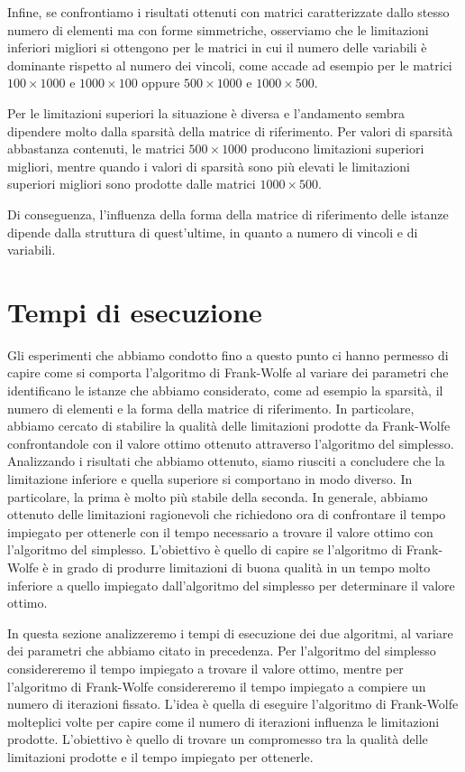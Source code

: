 Infine, se confrontiamo i risultati ottenuti con matrici caratterizzate dallo stesso numero di elementi ma con forme
simmetriche, osserviamo che le limitazioni inferiori migliori si ottengono per le matrici in cui il numero delle
variabili è dominante rispetto al numero dei vincoli, come accade ad esempio per le matrici \( 100\times 1000 \) e  \(
1000\times 100 \) oppure \( 500\times 1000 \) e  \( 1000\times 500 \).

Per le limitazioni superiori la situazione è diversa e l'andamento sembra dipendere molto dalla sparsità della
matrice di riferimento. Per valori di sparsità abbastanza contenuti, le matrici \( 500\times 1000 \) producono
limitazioni superiori migliori, mentre quando i valori di sparsità sono più elevati le limitazioni superiori migliori
sono prodotte dalle matrici  \( 1000\times 500 \).

Di conseguenza, l'influenza della forma della matrice di riferimento delle istanze dipende dalla struttura di
quest'ultime, in quanto a numero di vincoli e di variabili.

\section{Tempi di esecuzione}
Gli esperimenti che abbiamo condotto fino a questo punto ci hanno permesso di capire come si comporta l'algoritmo di
Frank-Wolfe al variare dei parametri che identificano le istanze che abbiamo considerato, come ad esempio la sparsità,
il numero di elementi e la forma della matrice di riferimento. In particolare, abbiamo cercato di stabilire la qualità
delle limitazioni prodotte da Frank-Wolfe confrontandole con il valore ottimo ottenuto attraverso l'algoritmo del
simplesso. Analizzando i risultati che abbiamo ottenuto, siamo riusciti a concludere che la limitazione inferiore e
quella superiore si comportano in modo diverso. In particolare, la prima è molto più stabile della seconda. In generale,
abbiamo ottenuto delle limitazioni ragionevoli che richiedono ora di confrontare il tempo impiegato per ottenerle con il
tempo necessario a trovare il valore ottimo con l'algoritmo del simplesso. L'obiettivo è quello di capire se
l'algoritmo di Frank-Wolfe è in grado di produrre limitazioni di buona qualità in un tempo molto inferiore a quello
impiegato dall'algoritmo del simplesso per determinare il valore ottimo.

In questa sezione analizzeremo i tempi di esecuzione dei due algoritmi, al variare dei parametri che abbiamo
citato in precedenza. Per l'algoritmo del simplesso considereremo il tempo impiegato a trovare il valore ottimo, mentre
per l'algoritmo di Frank-Wolfe considereremo il tempo impiegato a compiere un numero di iterazioni fissato. L'idea è
quella di eseguire l'algoritmo di Frank-Wolfe molteplici volte per capire come il numero di iterazioni influenza le
limitazioni prodotte. L'obiettivo è quello di trovare un compromesso tra la qualità delle limitazioni prodotte e il
tempo impiegato per ottenerle.


